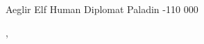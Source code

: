 
\filledCS%
  {Aeglir}%
  {Elf}%
  {Human Diplomat}%
  {Paladin}%
  {{-1}{1}{0}}%
  {{0}{0}{0}}%
  {%
    \setcounter{Academics}{1}
    \setcounter{Deceit}{1}
    \setcounter{Empathy}{1}

    \setcounter{Melee}{1}
    \partialelvish
  }%
  {\snapcaster, \laststand}%
  {}%

